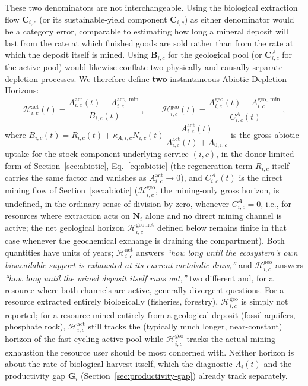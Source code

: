 \documentclass[twocolumn,10pt]{article}
\begin{document}
These two denominators are not interchangeable. Using the biological extraction flow $\mathbf C_{i,c}$ (or its sustainable-yield component $\bar{\mathbf C}_{i,c}$) as either denominator would be a category error, comparable to estimating how long a mineral deposit will last from the rate at which finished goods are sold rather than from the rate at which the deposit itself is mined. Using $\mathbf B_{i,c}$ for the geological pool (or $\mathbf C^A_{i,c}$ for the active pool) would likewise conflate two physically and causally separate depletion processes. We therefore define \textbf{two} instantaneous Abiotic Depletion Horizons:
\begin{equation}
\mathcal{H}^{\text{act}}_{i,c}(t) = \frac{A^{\text{act}}_{i,c}(t) - A^{\text{act},\min}_{i,c}}{B_{i,c}(t)}, \qquad
\mathcal{H}^{\text{geo}}_{i,c}(t) = \frac{A^{\text{geo}}_{i,c}(t) - A^{\text{geo},\min}_{i,c}}{C^A_{i,c}(t)}, \label{eq:instant-horizon}
\end{equation}
where $B_{i,c}(t)=R_{i,c}(t)+\kappa_{A,i,c}N_{i,c}(t)\,\dfrac{A^{\text{act}}_{i,c}(t)}{A^{\text{act}}_{i,c}(t)+A_{0,i,c}}$ is the gross abiotic uptake for the stock component underlying service $(i,c)$, in the donor-limited form of Section~\ref{sec:abiotic}, Eq.~\eqref{eq:abiotic} (the regeneration term $R_{i,c}$ itself carries the same factor and vanishes as $A^{\text{act}}_{i,c}\to0$), and $C^A_{i,c}(t)$ is the direct mining flow of Section~\ref{sec:abiotic} ($\mathcal H^{\text{geo}}_{i,c}$, the mining-only gross horizon, is undefined, in the ordinary sense of division by zero, whenever $C^A_{i,c}=0$, i.e., for resources where extraction acts on $\mathbf N_i$ alone and no direct mining channel is active; the net geological horizon $\mathcal H^{\text{geo,net}}_{i,c}$ defined below remains finite in that case whenever the geochemical exchange is draining the compartment). Both quantities have units of years; $\mathcal H^{\text{act}}_{i,c}$ answers \emph{``how long until the ecosystem's own bioavailable support is exhausted at its current metabolic draw,''} and $\mathcal H^{\text{geo}}_{i,c}$ answers \emph{``how long until the mined deposit itself runs out,''} two different and, for a resource where both channels are active, generally divergent questions. For a resource extracted entirely biologically (fisheries, forestry), $\mathcal H^{\text{geo}}_{i,c}$ is simply not reported; for a resource mined entirely from a geological deposit (fossil aquifers, phosphate rock), $\mathcal H^{\text{act}}_{i,c}$ still tracks the (typically much longer, near-constant) horizon of the fast-cycling active pool while $\mathcal H^{\text{geo}}_{i,c}$ tracks the actual mining exhaustion the resource user should be most concerned with. Neither horizon is about the rate of biological harvest itself, which the diagnostic $\Lambda_i(t)$ and the productivity gap $\mathbf G_i$ (Section~\ref{sec:productivity-gap}) already track separately.
\end{document}
